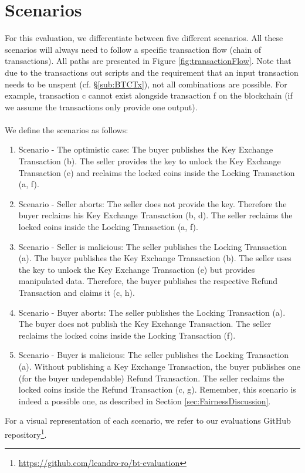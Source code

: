 \documentclass{cacthesis}
\begin{document}
	    \section{Scenarios}
	    \label{sec:Scenarios}
	    For this evaluation, we differentiate between five different scenarios. All these scenarios will always need to follow a specific transaction flow (chain of transactions). All paths are presented in Figure \ref{fig:transactionFlow}. Note that due to the transactions out scripts and the requirement that an input transaction needs to be unspent (cf. §\ref{sub:BTCTx}), not all combinations are possible. For example, transaction c cannot exist alongside transaction f on the blockchain (if we assume the transactions only provide one output).
	    \\\\
	    We define the scenarios as follows:
	    \begin{enumerate}
            \item Scenario - The optimistic case: The buyer publishes the Key Exchange Transaction (b). The seller provides the key to unlock the Key Exchange Transaction (e) and reclaims the locked coins inside the Locking Transaction (a, f).

            \item Scenario - Seller aborts: The seller does not provide the key. Therefore the buyer reclaims his Key Exchange Transaction (b, d). The seller reclaims the locked coins inside the Locking Transaction (a, f).

            \item Scenario - Seller is malicious: The seller publishes the Locking Transaction (a). The buyer publishes the Key Exchange Transaction (b). The seller uses the key to unlock the Key Exchange Transaction (e) but provides manipulated data. Therefore, the buyer publishes the respective Refund Transaction and claims it (c, h).
            
            \item Scenario - Buyer aborts: The seller publishes the Locking Transaction (a). The buyer does not publish the Key Exchange Transaction. The seller reclaims the locked coins inside the Locking Transaction (f).
            
            \item Scenario - Buyer is malicious: The seller publishes the Locking Transaction (a). Without publishing a Key Exchange Transaction, the buyer publishes one (for the buyer undependable) Refund Transaction. The seller reclaims the locked coins inside the Refund Transaction (c, g). Remember, this scenario is indeed a possible one, as described in Section \ref{sec:FairnessDiscussion}.
        \end{enumerate}
	    For a visual representation of each scenario, we refer to our evaluations GitHub repository\footnote{\url{https://github.com/leandro-ro/bt-evaluation}}.
	    
\end{document}
